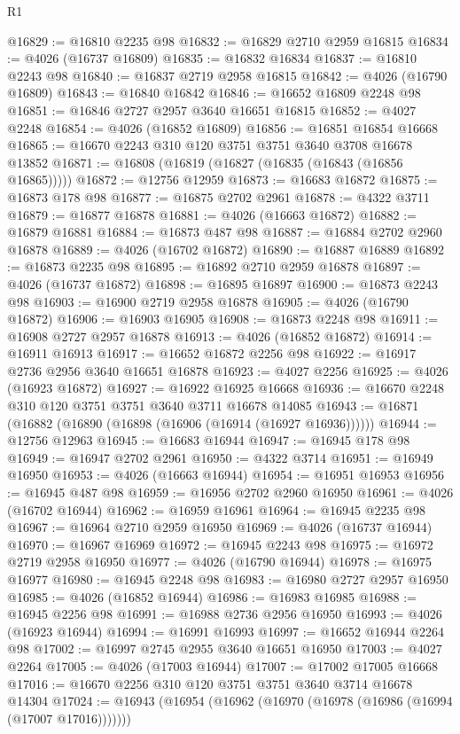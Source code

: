 \begin{lexlean}{R1}
\begin{coremodule}
@16829 := @16810 @2235 @98
@16832 := @16829 @2710 @2959 @16815
@16834 := @4026 (@16737 @16809)
@16835 := @16832 @16834
@16837 := @16810 @2243 @98
@16840 := @16837 @2719 @2958 @16815
@16842 := @4026 (@16790 @16809)
@16843 := @16840 @16842
@16846 := @16652 @16809 @2248 @98
@16851 := @16846 @2727 @2957 @3640 @16651 @16815
@16852 := @4027 @2248
@16854 := @4026 (@16852 @16809)
@16856 := @16851 @16854 @16668
@16865 := @16670 @2243 @310 @120 @3751 @3751 @3640 @3708 @16678 @13852
@16871 := @16808 (@16819 (@16827 (@16835 (@16843 (@16856 @16865)))))
@16872 := @12756 @12959
@16873 := @16683 @16872
@16875 := @16873 @178 @98
@16877 := @16875 @2702 @2961
@16878 := @4322 @3711
@16879 := @16877 @16878
@16881 := @4026 (@16663 @16872)
@16882 := @16879 @16881
@16884 := @16873 @487 @98
@16887 := @16884 @2702 @2960 @16878
@16889 := @4026 (@16702 @16872)
@16890 := @16887 @16889
@16892 := @16873 @2235 @98
@16895 := @16892 @2710 @2959 @16878
@16897 := @4026 (@16737 @16872)
@16898 := @16895 @16897
@16900 := @16873 @2243 @98
@16903 := @16900 @2719 @2958 @16878
@16905 := @4026 (@16790 @16872)
@16906 := @16903 @16905
@16908 := @16873 @2248 @98
@16911 := @16908 @2727 @2957 @16878
@16913 := @4026 (@16852 @16872)
@16914 := @16911 @16913
@16917 := @16652 @16872 @2256 @98
@16922 := @16917 @2736 @2956 @3640 @16651 @16878
@16923 := @4027 @2256
@16925 := @4026 (@16923 @16872)
@16927 := @16922 @16925 @16668
@16936 := @16670 @2248 @310 @120 @3751 @3751 @3640 @3711 @16678 @14085
@16943 := @16871 (@16882 (@16890 (@16898 (@16906 (@16914 (@16927 @16936))))))
@16944 := @12756 @12963
@16945 := @16683 @16944
@16947 := @16945 @178 @98
@16949 := @16947 @2702 @2961
@16950 := @4322 @3714
@16951 := @16949 @16950
@16953 := @4026 (@16663 @16944)
@16954 := @16951 @16953
@16956 := @16945 @487 @98
@16959 := @16956 @2702 @2960 @16950
@16961 := @4026 (@16702 @16944)
@16962 := @16959 @16961
@16964 := @16945 @2235 @98
@16967 := @16964 @2710 @2959 @16950
@16969 := @4026 (@16737 @16944)
@16970 := @16967 @16969
@16972 := @16945 @2243 @98
@16975 := @16972 @2719 @2958 @16950
@16977 := @4026 (@16790 @16944)
@16978 := @16975 @16977
@16980 := @16945 @2248 @98
@16983 := @16980 @2727 @2957 @16950
@16985 := @4026 (@16852 @16944)
@16986 := @16983 @16985
@16988 := @16945 @2256 @98
@16991 := @16988 @2736 @2956 @16950
@16993 := @4026 (@16923 @16944)
@16994 := @16991 @16993
@16997 := @16652 @16944 @2264 @98
@17002 := @16997 @2745 @2955 @3640 @16651 @16950
@17003 := @4027 @2264
@17005 := @4026 (@17003 @16944)
@17007 := @17002 @17005 @16668
@17016 := @16670 @2256 @310 @120 @3751 @3751 @3640 @3714 @16678 @14304
@17024 := @16943 (@16954 (@16962 (@16970 (@16978 (@16986 (@16994 (@17007 @17016)))))))

\end{coremodule}
\end{lexlean}
